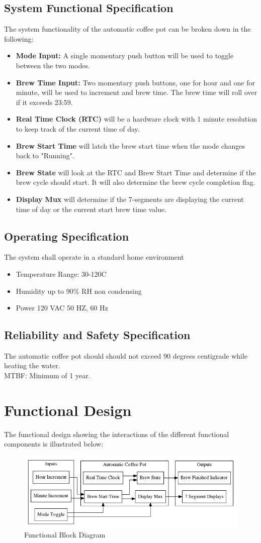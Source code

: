 \documentclass[12pt]{article}
\begin{document}
\subsection{System Functional Specification}
The system functionality of the automatic coffee pot can be broken down in the following:
\begin{itemize}
    \item \textbf{Mode Input:} A single momentary push button will be used to toggle between the two modes.
    \item \textbf{Brew Time Input: } Two momentary push buttons, one for hour and one for minute, will be used to increment and brew time. The brew time will roll over if it exceeds 23:59.
    \item \textbf{Real Time Clock (RTC)} will be a hardware clock with 1 minute resolution to keep track of the current time of day.
    \item \textbf{Brew Start Time} will latch the brew start time when the mode changes back to "Running".
    \item \textbf{Brew State} will look at the RTC and Brew Start Time and determine if the brew cycle should start. It will also determine the brew cycle completion flag.
    \item \textbf{Display Mux} will determine if the 7-segments are displaying the current time of day or the current start brew time value.
\end{itemize}

\subsection{Operating Specification}
The system shall operate in a standard home environment
\begin{itemize}
        \item Temperature Range: 30-120C
        \item Humidity up to 90\% RH non condensing
        \item Power 120 VAC 50 HZ, 60 Hz
\end{itemize}

\subsection{Reliability and Safety Specification}
The automatic coffee pot should should not exceed 90 degrees centigrade while heating the water.\\
MTBF: Minimum of 1 year.


\section{Functional Design}
The functional design showing the interactions of the different functional components is illustrated below:
\begin{figure}
\centering
\includegraphics[scale=0.6]{block_diagram.png}
\caption{Functional Block Diagram}
\label{fig:block_diagram}
\end{figure}
\end{document}
